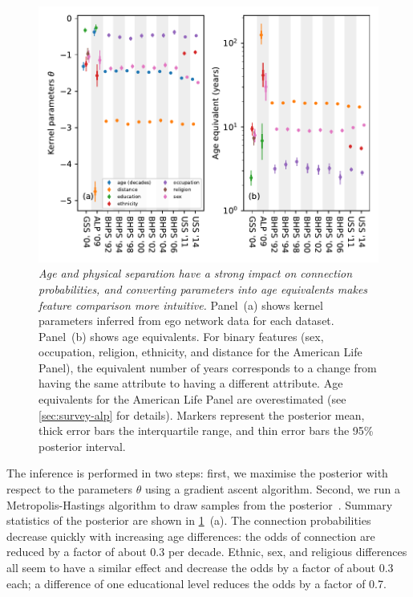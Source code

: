\documentclass{scrartcl}
\newcommand{\titlecaption}[2]{\caption[#1]{\emph{#1} #2}}
\begin{document}
\begin{figure}
    \includegraphics{coefficients-age-equivalent}
    \titlecaption{Age and physical separation have a strong impact on connection probabilities, and converting parameters into age equivalents makes feature comparison more intuitive.}{
    Panel~(a) shows kernel parameters inferred from ego network data for each dataset.
    Panel~(b) shows age equivalents. For binary features (sex, occupation, religion, ethnicity, and distance for the American Life Panel), the equivalent number of years corresponds to a change from having the same attribute to having a different attribute. Age equivalents for the American Life Panel are overestimated (see \cref{sec:survey-alp} for details).
    Markers represent the posterior mean, thick error bars the interquartile range, and thin error bars the 95\% posterior interval.\label{fig:parameters-and-age-equivalents}}
\end{figure}

The inference is performed in two steps: first, we maximise the posterior with respect to the parameters $\theta$ using a gradient ascent algorithm. Second, we run a Metropolis-Hastings algorithm to draw samples from the posterior~\cite{Hastings1970}. Summary statistics of the posterior are shown in \cref{fig:parameters-and-age-equivalents}~(a). The connection probabilities decrease quickly with increasing age differences: the odds of connection are reduced by a factor of about 0.3 per decade. Ethnic, sex, and religious differences all seem to have a similar effect and decrease the odds by a factor of about 0.3 each; a difference of one educational level reduces the odds by a factor of 0.7.
\end{document}
